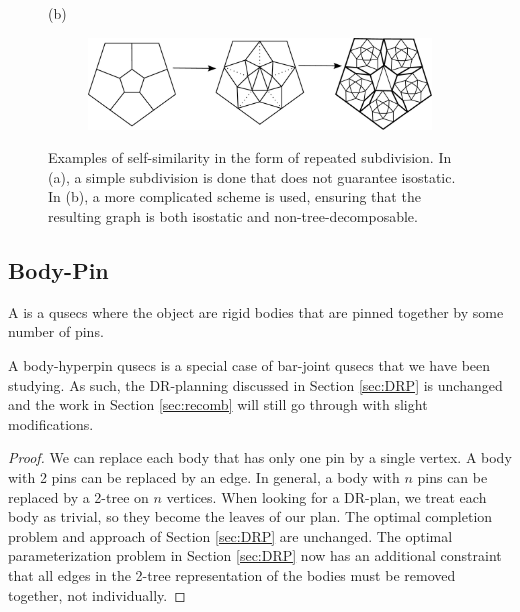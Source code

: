 \begin{figure}
    (b)
    \begin{subfigure}{0.8\linewidth}
        \includegraphics[width=\linewidth]{img/pentawesome}
    \end{subfigure}
    \caption{Examples of self-similarity in the form of repeated subdivision. In (a), a simple subdivision is done that does not guarantee isostatic. In (b), a more complicated scheme is used, ensuring that the resulting graph is both isostatic and non-tree-decomposable.}
    \label{fig:subdivision}
\end{figure}

\subsection{Body-Pin}


\begin{definition}
    A  is a qusecs where the object are rigid bodies that are pinned together by some number of pins.
\end{definition}

\begin{remark}
    A body-hyperpin qusecs is a special case of bar-joint qusecs that we have been studying. As such, the DR-planning discussed in Section \ref{sec:DRP} is unchanged and the work in Section \ref{sec:recomb} will still go through with slight modifications.
\end{remark}

\begin{proof}
    We can replace each body that has only one pin by a single vertex. A body with 2 pins can be replaced by an edge. In general, a body with $n$ pins can be replaced by a 2-tree on $n$ vertices. When looking for a DR-plan, we treat each body as trivial, so they become the leaves of our plan. The optimal completion problem and approach of Section \ref{sec:DRP} are unchanged. The optimal parameterization problem in Section \ref{sec:DRP} now has an additional constraint that all edges in the 2-tree representation of the bodies must be removed together, not individually.
\end{proof}

